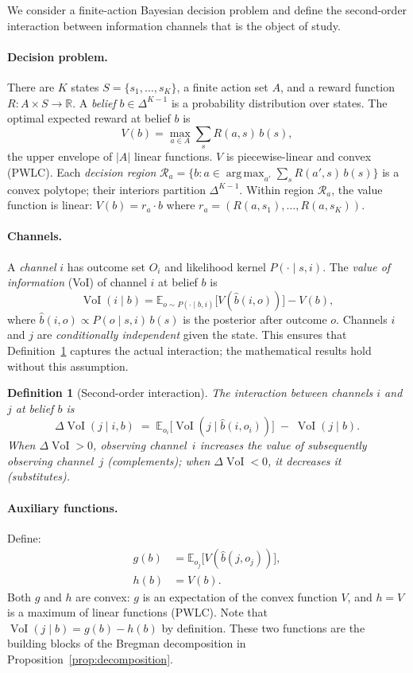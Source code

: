 \documentclass{article}
\DeclareMathOperator*{\argmax}{arg\,max}
\newcommand{\VoI}{\operatorname{VoI}}
\newcommand{\bpost}{\hat{b}}
\newcommand{\E}{\mathbb{E}}
\newcommand{\R}{\mathbb{R}}
\newtheorem{definition}[theorem]{Definition}
\begin{document}
We consider a finite-action Bayesian decision problem and define the second-order interaction between information channels that is the object of study.

\paragraph{Decision problem.}
There are $K$ states $S = \{s_1, \ldots, s_K\}$, a finite action set $A$, and a reward function $R : A \times S \to \R$.
A \emph{belief} $b \in \Delta^{K-1}$ is a probability distribution over states.
The optimal expected reward at belief $b$ is
\[
  V(b) = \max_{a \in A} \sum_s R(a, s)\, b(s),
\]
the upper envelope of $|A|$ linear functions.
$V$ is piecewise-linear and convex (PWLC).
Each \emph{decision region} $\mathcal{R}_a = \{b : a \in \argmax_{a'} \sum_s R(a', s)\, b(s)\}$ is a convex polytope; their interiors partition $\Delta^{K-1}$.
Within region $\mathcal{R}_a$, the value function is linear: $V(b) = r_a \cdot b$ where $r_a = (R(a, s_1), \ldots, R(a, s_K))$.

\paragraph{Channels.}
A \emph{channel} $i$ has outcome set $O_i$ and likelihood kernel $P(\cdot \mid s, i)$.
The \emph{value of information} (VoI) of channel $i$ at belief $b$ is
\[
  \VoI(i \mid b) = \E_{o \sim P(\cdot \mid b, i)}\bigl[V(\bpost(i, o))\bigr] - V(b),
\]
where $\bpost(i, o) \propto P(o \mid s, i)\, b(s)$ is the posterior after outcome $o$.
Channels $i$ and $j$ are \emph{conditionally independent} given the state. This ensures that Definition~\ref{def:delta} captures the actual interaction; the mathematical results hold without this assumption.

\begin{definition}[Second-order interaction]\label{def:delta}
The \emph{interaction} between channels $i$ and $j$ at belief $b$ is
\[
  \Delta\VoI(j \mid i, b)
  \;=\;
  \E_{o_i}\bigl[\VoI(j \mid \bpost(i, o_i))\bigr]
  \;-\;
  \VoI(j \mid b).
\]
When $\Delta\VoI > 0$, observing channel~$i$ \emph{increases} the value of subsequently observing channel~$j$ (complements); when $\Delta\VoI < 0$, it decreases it (substitutes).
\end{definition}

\paragraph{Auxiliary functions.}
Define:
\begin{align}
  g(b) &= \E_{o_j}\bigl[V(\bpost(j, o_j))\bigr], \label{eq:g} \\
  h(b) &= V(b). \label{eq:h}
\end{align}
Both $g$ and $h$ are convex: $g$ is an expectation of the convex function $V$, and $h = V$ is a maximum of linear functions (PWLC).
Note that $\VoI(j \mid b) = g(b) - h(b)$ by definition.
These two functions are the building blocks of the Bregman decomposition in Proposition~\ref{prop:decomposition}.
\end{document}
